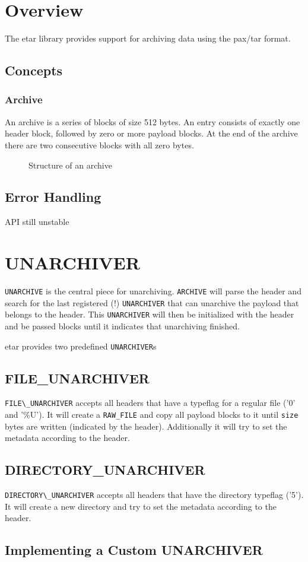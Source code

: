 \documentclass[a4paper]{report}
\begin{document}
\chapter{Overview}
The etar library provides support for archiving data using the pax/tar format.

\section{Concepts}
\subsection{Archive}
An archive is a series of blocks of size 512 bytes. An entry consists of exactly
one header block, followed by zero or more payload blocks. At the end of the
archive there are two consecutive blocks with all zero bytes.

\begin{figure}[h]
	\begin{center}
		
	\end{center}
	\caption{Structure of an archive}
\end{figure}

\section{Error Handling}
API still unstable






\chapter{UNARCHIVER}
\lstinline;UNARCHIVE; is the central piece for unarchiving. \lstinline;ARCHIVE;
will parse the header and search for the last registered (!)
\lstinline;UNARCHIVER; that can unarchive the payload that belongs to the
header. This \lstinline;UNARCHIVER; will then be initialized with the header
and be passed blocks until it indicates that unarchiving finished.

etar provides two predefined \lstinline;UNARCHIVER;s

\section{FILE\_UNARCHIVER}
\lstinline;FILE\_UNARCHIVER; accepts all headers that have a typeflag for a
regular file ('0' and '\%U'). It will create a \lstinline;RAW_FILE; and copy all
payload blocks to it until \lstinline;size; bytes are written (indicated by the
header). Additionally it will try to set the metadata according to the header.

\section{DIRECTORY\_UNARCHIVER}
\lstinline;DIRECTORY\_UNARCHIVER; accepts all headers that have the directory
typeflag ('5'). It will create a new directory and try to set the metadata
according to the header.

\section{Implementing a Custom UNARCHIVER}

\printbibliography[heading=bibintoc]
\end{document}
